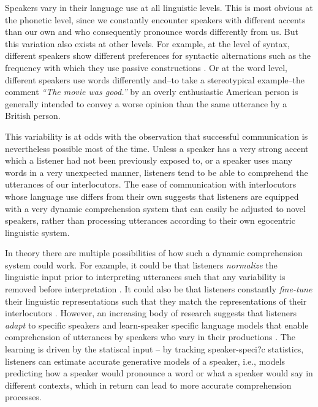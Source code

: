 Speakers vary in their language use at all linguistic levels. This is most obvious at the phonetic level, since we constantly encounter speakers with different accents than our own and who consequently pronounce words differently from us. But this variation also exists at other levels. For example, at the level of syntax, different speakers show different preferences for syntactic alternations such as the frequency with which they use passive constructions \cite{Weiner1983}. Or at the word level, different speakers use words differently and--to take a stereotypical example--the comment \textit{``The movie was good.''} by an overly enthusiastic American person is generally intended to convey a worse opinion than the same utterance by a British person.

This variability is at odds with the observation that successful communication is nevertheless possible most of the time. Unless a speaker has a very strong accent which a listener had not been previously exposed to, or a speaker uses many words in a very unexpected manner, listeners tend to be able to comprehend the utterances of our interlocutors. The ease of communication with interlocutors whose language use differs from their own suggests that listeners are equipped with a very dynamic comprehension system that can easily be adjusted to novel speakers, rather than processing utterances according to their own egocentric linguistic system.

In theory there are multiple possibilities of how such a dynamic comprehension system could work. For example, it could be that listeners \textit{normalize} the linguistic input prior to interpreting utterances such that any variability is removed before interpretation . It could also be that listeners constantly \textit{fine-tune} their linguistic representations such that they match the representations of their interlocutors . However, an increasing body of research suggests that listeners \textit{adapt} to specific speakers and learn-speaker specific language models that enable comprehension of utterances by speakers who vary in their productions \cite{Norris2003,Kraljic2007,Bradlow2008, Kamide2012,Kleinschmidt2015,Fine2016,Roettger2019}. The learning is driven by the statiscal input -- by tracking speaker-speci?c statistics, listeners can estimate accurate generative models of a speaker, i.e., models predicting how a speaker would pronounce a word or what a speaker would say in different contexts, which in return can lead to more accurate comprehension processes.

